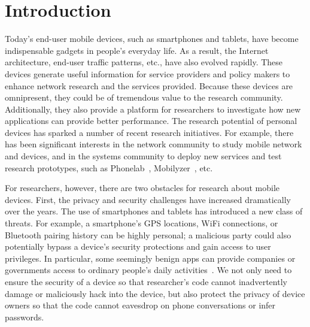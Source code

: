\section{Introduction}

Today's end-user mobile devices, such as smartphones and
tablets, have become indispensable gadgets in people's everyday
life.  As a result, the Internet architecture, end-user traffic
patterns, etc., have also evolved rapidly. These devices 
generate useful information for service providers and policy
makers to enhance network research and the services provided.
Because these devices are omnipresent, they could be of tremendous
value to the research community.
Additionally, they also provide a platform for researchers to
investigate how new applications can provide better performance.
The research potential of personal devices has sparked a number 
of recent research initiatives.
For example, there has been significant interests in the network
community to study mobile network and devices, and in the
systems community to deploy new services and test research
prototypes, such as Phonelab~\cite{phonelab, nandugudi2013phonelab}, 
Mobilyzer~\cite{nikravesh2015mobilyzer}, etc.
					
For researchers, however, there are two obstacles for research
about mobile devices. First, the privacy and security challenges
have increased dramatically over the years. The use of 
smartphones and tablets has introduced a new class of threats. 
For example, a smartphone's GPS locations,
WiFi connections, or Bluetooth pairing history can be highly
personal; a malicious party could also potentially bypass a
device's security protections and gain access to user
privileges. In particular, some seemingly benign apps can provide 
companies or governments access to ordinary 
people's daily activities~\cite{AngryBirds}. 
We not only need to ensure the security of a device
so that researcher's code cannot inadvertently damage or
maliciously hack into the device, but also protect the privacy
of device owners so that the code cannot eavesdrop on phone
conversations or infer passwords.

